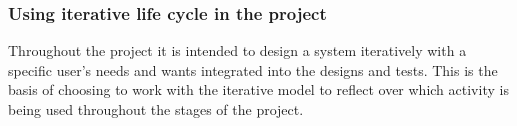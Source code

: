 \subsubsection{Using iterative life cycle in the project}
Throughout the project it is intended to design a system iteratively with a specific user’s needs and wants integrated into the designs and tests. This is the basis of choosing to work with the iterative model to reflect over which activity is being used throughout the stages of the project.